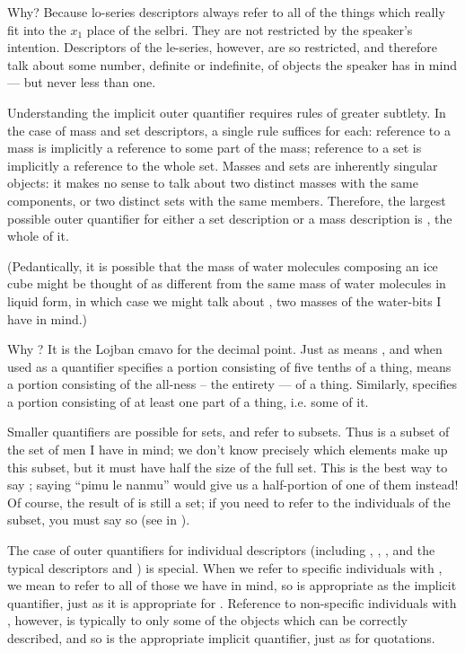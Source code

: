 Why? Because lo-series descriptors always refer to all of
    the things which really fit into the $x_1$ place of the selbri.
    They are not restricted by the speaker's intention. Descriptors
    of the le-series, however, are so restricted, and therefore
    talk about some number, definite or indefinite, of objects the
    speaker has in mind --- but never less than one.

Understanding the implicit outer quantifier requires rules
    of greater subtlety. In the case of mass and set descriptors, a
    single rule suffices for each: reference to a mass is
    implicitly a reference to some part of the mass; reference to a
    set is implicitly a reference to the whole set. Masses and sets
    are inherently singular objects: it makes no sense to talk
    about two distinct masses with the same components, or two
    distinct sets with the same members. Therefore, the largest
    possible outer quantifier for either a set description or a
    mass description is , the whole of it.

(Pedantically, it is possible that the mass of water
    molecules composing an ice cube might be thought of as
    different from the same mass of water molecules in liquid form,
    in which case we might talk about , two masses
    of the water-bits I have in mind.)

Why ? It is the Lojban cmavo for the decimal point.
    Just as  means , and when used as a quantifier
    specifies a portion consisting of five tenths of a thing,
     means a portion consisting of the all-ness -- the
    entirety --- of a thing. Similarly,  specifies a
    portion consisting of at least one part of a thing, i.e. some
    of it.

Smaller quantifiers are possible for sets, and refer to
    subsets. Thus  is a subset of the set of men
    I have in mind; we don't know precisely which elements make up
    this subset, but it must have half the size of the full set.
    This is the best way to say ; saying ``pimu
    le nanmu'' would give us a half-portion of one of them instead!
    Of course, the result of  is still a set; if
    you need to refer to the individuals of the subset, you must
    say so (see  in ).

The case of outer quantifiers for individual descriptors
    (including , , , and the typical descriptors
     and ) is special. When we refer to specific
    individuals with , we mean to refer to all of those we
    have in mind, so  is appropriate as the implicit
    quantifier, just as it is appropriate for . Reference to
    non-specific individuals with , however, is typically to
    only some of the objects which can be correctly described, and
    so  is the appropriate implicit quantifier, just as for
    quotations.

